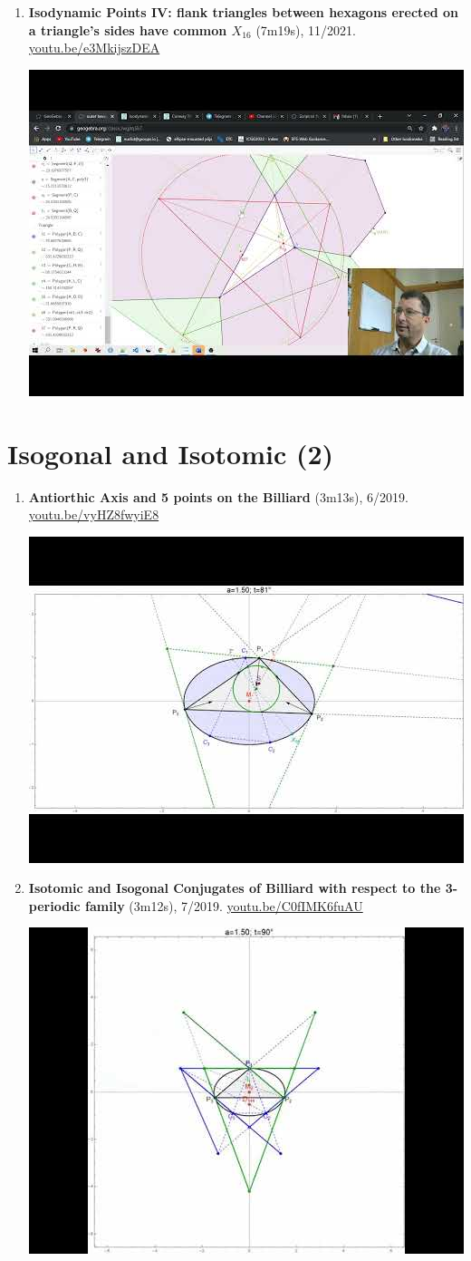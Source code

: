 \documentclass[12pt]{article}
\begin{document}
\begin{enumerate}[resume]
% 
\item \textbf{Isodynamic Points IV: flank triangles between hexagons erected on a triangle's sides have common $X_{16}$} (7m19s), 11/2021. \href{https://youtu.be/e3MkijszDEA}{\url{youtu.be/e3MkijszDEA}}
\begin{center}\includegraphics[width=.5\textwidth]{pics/e3MkijszDEA.jpg}\end{center}
% 
\end{enumerate}

\section{Isogonal and Isotomic (2)}

\begin{enumerate}[resume]
\item \textbf{Antiorthic Axis and 5 points on the Billiard} (3m13s), 6/2019. \href{https://youtu.be/vyHZ8fwyiE8}{\url{youtu.be/vyHZ8fwyiE8}}
\begin{center}\includegraphics[width=.5\textwidth]{pics/vyHZ8fwyiE8.jpg}\end{center}
% 
\item \textbf{Isotomic and Isogonal Conjugates of Billiard with respect to the 3-periodic family} (3m12s), 7/2019. \href{https://youtu.be/C0fIMK6fuAU}{\url{youtu.be/C0fIMK6fuAU}}
\begin{center}\includegraphics[width=.5\textwidth]{pics/C0fIMK6fuAU.jpg}\end{center}
% 
\end{enumerate}
\end{document}
